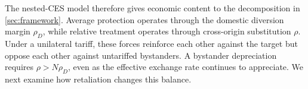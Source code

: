 The nested-CES model therefore gives economic content to the decomposition in \cref{sec:framework}. Average protection operates through the domestic diversion margin $\rho_D$, while relative treatment operates through cross-origin substitution $\rho$. Under a unilateral tariff, these forces reinforce each other against the target but oppose each other against untariffed bystanders. A bystander depreciation requires $\rho>N\rho_D$, even as the effective exchange rate continues to appreciate. We next examine how retaliation changes this balance.

\FloatBarrier
